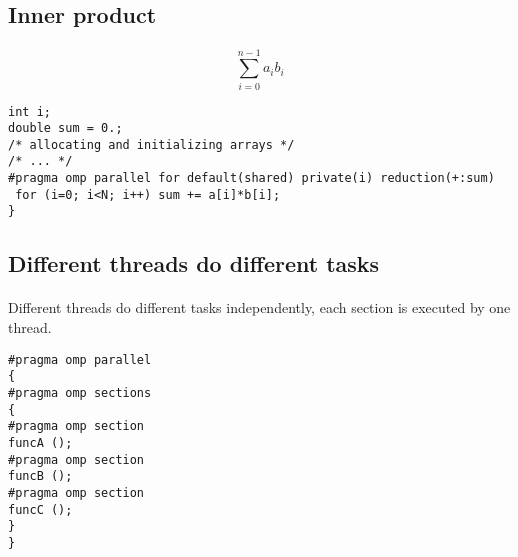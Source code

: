 \documentclass[%
oneside,                 %
final,                   %
10pt]{article}
\begin{document}
\subsection*{Inner product}

\paragraph{}
\[
\sum_{i=0}^{n-1} a_ib_i
\]








\begin{verbatim}
int i;
double sum = 0.;
/* allocating and initializing arrays */
/* ... */
#pragma omp parallel for default(shared) private(i) reduction(+:sum)
 for (i=0; i<N; i++) sum += a[i]*b[i];
}

\end{verbatim}



\subsection*{Different threads do different tasks}

\paragraph{}

Different threads do different tasks independently, each section is executed by one thread.













\begin{verbatim}
#pragma omp parallel
{
#pragma omp sections
{
#pragma omp section
funcA ();
#pragma omp section
funcB ();
#pragma omp section
funcC ();
}
}

\end{verbatim}
\end{document}
